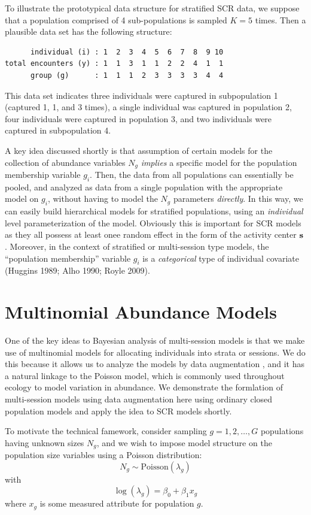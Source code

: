 To illustrate the prototypical data structure for stratified SCR data,
we suppose that a population comprised of 4 sub-populations is sampled
$K=5$ times. Then a plausible data set has the following structure:
\begin{verbatim}
      individual (i) : 1  2  3  4  5  6  7  8  9 10  
total encounters (y) : 1  1  3  1  1  2  2  4  1  1
      group (g)      : 1  1  1  2  3  3  3  3  4  4
\end{verbatim}
This data set indicates three individuals were captured in
subpopulation 1 (captured 1, 1, and 3 times), a single individual was
captured in population 2, four individuals were captured in population
3, and two individuals were captured in subpopulation 4.

A key idea discussed shortly is that assumption of certain models for
the collection of abundance variables $N_{g}$ {\it implies} a specific
model for the population membership variable $g_{i}$.  Then, the data
from all populations can essentially be pooled, and analyzed as data
from a single population with the appropriate model on $g_{i}$,
without having to model the $N_{g}$ parameters {\it directly}. In this
way, we can easily build hierarchical models for stratified
populations, using an {\it individual} level parameterization of the
model. Obviously this is important for SCR models as they all possess
at least onee random effect in the form of the activity center ${\bf
  s}$. Moreover, in the context of stratified or multi-session type
models, the ``population membership'' variable $g_{i}$ is a {\it
  categorical} type of individual covariate (Huggins 1989; Alho 1990;
Royle 2009).


\section{Multinomial Abundance Models}


One of the key ideas to Bayesian analysis of multi-session models is
that we make use of multinomial models for allocating individuals into
strata or sessions. We do this because it allows us to analyze the
models by data augmentation \citep{converse_royle:2012,
  royle_coverse:2013}, and it has a natural linkage to the Poisson
model, which is commonly used throughout ecology to model variation
in abundance. We demonstrate the formlation of multi-session models
using data augmentation here using ordinary closed population models
and apply the idea to SCR models shortly.

To motivate the technical famework, 
consider sampling $g=1,2,\ldots,G$ populations having
unknown sizes $N_{g}$, and we wish to impose model structure on the
population size variables using a Poisson distribution:
\begin{equation}
 N_{g} \sim \mbox{Poisson}(\lambda_{g})
\label{eq.poisson1}
\end{equation}
with
\begin{equation}
\log( \lambda_{g} ) = \beta_{0} + \beta_{1} x_{g}
\label{eq.poisson2}
\end{equation}
where $x_{g}$ is some measured attribute for population $g$. 

